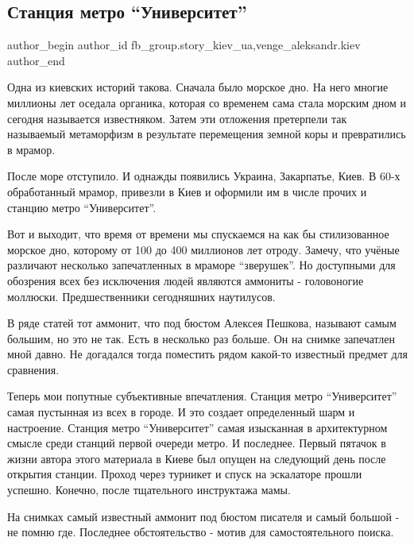  
 
 
 
 
 
\subsection{Станция метро \enquote{Университет}}
\label{sec:11_01_2022.fb.fb_group.story_kiev_ua.2.stancia_metro_universitet}
 
\ifcmt
 author_begin
   author_id fb_group.story_kiev_ua,venge_aleksandr.kiev
 author_end
\fi

Одна из киевских историй такова. Сначала было морское дно. На него многие
миллионы лет оседала органика, которая со временем сама стала морским дном и
сегодня называется известняком. Затем эти отложения претерпели так называемый
метаморфизм в результате перемещения земной коры и превратились в мрамор.

После море отступило. И однажды появились Украина, Закарпатье, Киев. В 60-х
обработанный мрамор, привезли в Киев и оформили им в числе прочих и станцию
метро \enquote{Университет}. 


Вот и выходит, что время от времени мы спускаемся на как бы стилизованное
морское дно, которому от 100 до 400 миллионов лет отроду. Замечу, что учёные
различают несколько запечатленных в мраморе \enquote{зверушек}. Но доступными для
обозрения всех без исключения людей являются аммониты - головоногие моллюски.
Предшественники сегодняшних наутилусов. 

В ряде статей тот аммонит, что под бюстом Алексея Пешкова, называют самым
большим, но это не так. Есть в несколько раз больше. Он на снимке запечатлен
мной давно. Не догадался тогда поместить рядом какой-то известный предмет для
сравнения.

Теперь мои попутные субъективные впечатления. Станция метро \enquote{Университет} самая
пустынная из всех в городе. И это создает определенный шарм и настроение.
Станция метро \enquote{Университет} самая изысканная в архитектурном смысле среди
станций первой очереди метро. И последнее. Первый пятачок в жизни автора этого
материала в Киеве был опущен на следующий день после открытия станции. Проход
через турникет и спуск на эскалаторе прошли успешно. Конечно, после тщательного
инструктажа мамы. 

На снимках самый известный аммонит под бюстом писателя и самый большой - не
помню где. Последнее обстоятельство - мотив для самостоятельного поиска.

